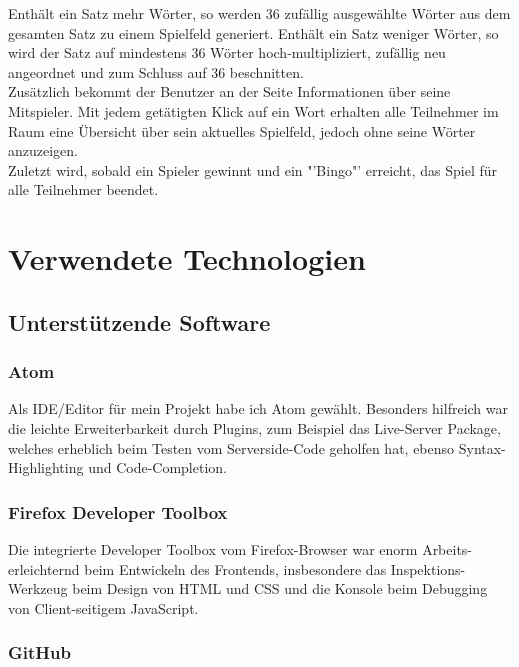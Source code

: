 \documentclass[12pt]{scrartcl}
\begin{document}
		Enthält ein Satz mehr Wörter, so werden 36 zufällig ausgewählte Wörter aus dem gesamten Satz zu einem Spielfeld generiert. Enthält ein Satz weniger Wörter, so wird der Satz auf mindestens 36 Wörter hoch-multipliziert, zufällig neu angeordnet und zum Schluss auf 36 beschnitten.\\
		
		Zusätzlich bekommt der Benutzer an der Seite Informationen über seine Mitspieler. Mit jedem getätigten Klick auf ein Wort erhalten alle Teilnehmer im Raum eine Übersicht über sein aktuelles Spielfeld, jedoch ohne seine Wörter anzuzeigen.\\
		
		Zuletzt wird, sobald ein Spieler gewinnt und ein "'Bingo"' erreicht, das Spiel für alle Teilnehmer beendet.

\section{Verwendete Technologien}

	\subsection{Unterstützende Software}
	
		\subsubsection{Atom}
		
			Als IDE/Editor für mein Projekt habe ich Atom gewählt. Besonders hilfreich war die leichte  Erweiterbarkeit durch Plugins, zum Beispiel das Live-Server Package, welches erheblich beim Testen vom Serverside-Code geholfen hat, ebenso Syntax-Highlighting und Code-Completion.
		
		\subsubsection{Firefox Developer Toolbox}
		
			Die integrierte Developer Toolbox vom Firefox-Browser war enorm Arbeits-erleichternd beim Entwickeln des Frontends, insbesondere das Inspektions-Werkzeug beim Design von HTML und CSS und die Konsole beim Debugging von Client-seitigem JavaScript.
		
		\subsubsection{GitHub}
		
\end{document}
